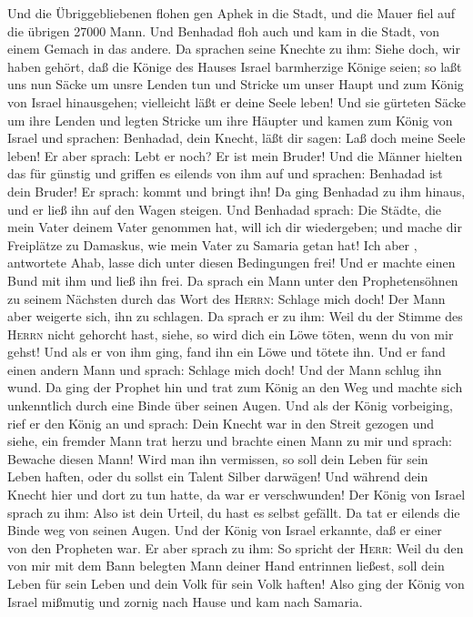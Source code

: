  Und die Übriggebliebenen flohen gen Aphek in die Stadt,
und die Mauer fiel auf die übrigen 27000 Mann. Und Benhadad floh auch
und kam in die Stadt, von einem Gemach in das andere.  Da
sprachen seine Knechte zu ihm: Siehe doch, wir haben gehört, daß die
Könige des Hauses Israel barmherzige Könige seien; so laßt uns nun Säcke
um unsre Lenden tun und Stricke um unser Haupt und zum König von Israel
hinausgehen; vielleicht läßt er deine Seele leben!  Und
sie gürteten Säcke um ihre Lenden und legten Stricke um ihre Häupter und
kamen zum König von Israel und sprachen: Benhadad, dein Knecht, läßt dir
sagen: Laß doch meine Seele leben! Er aber sprach: Lebt er noch? Er ist
mein Bruder!  Und die Männer hielten das für günstig und
griffen es eilends von ihm auf und sprachen: Benhadad ist dein Bruder!
Er sprach: kommt und bringt ihn! Da ging Benhadad zu ihm hinaus, und er
ließ ihn auf den Wagen steigen.  Und Benhadad sprach: Die
Städte, die mein Vater deinem Vater genommen hat, will ich dir
wiedergeben; und mache dir Freiplätze zu Damaskus, wie mein Vater zu
Samaria getan hat! Ich aber , antwortete Ahab, lasse dich unter diesen
Bedingungen frei! Und er machte einen Bund mit ihm und ließ ihn frei.
 Da sprach ein Mann unter den Prophetensöhnen zu seinem
Nächsten durch das Wort des \textsc{Herrn}: Schlage mich doch! Der Mann
aber weigerte sich, ihn zu schlagen.  Da sprach er zu
ihm: Weil du der Stimme des \textsc{Herrn} nicht gehorcht hast, siehe,
so wird dich ein Löwe töten, wenn du von mir gehst! Und als er von ihm
ging, fand ihn ein Löwe und tötete ihn.  Und er fand
einen andern Mann und sprach: Schlage mich doch! Und der Mann schlug ihn
wund.  Da ging der Prophet hin und trat zum König an den
Weg und machte sich unkenntlich durch eine Binde über seinen Augen.
 Und als der König vorbeiging, rief er den König an und
sprach: Dein Knecht war in den Streit gezogen und siehe, ein fremder
Mann trat herzu und brachte einen Mann zu mir und sprach: Bewache diesen
Mann! Wird man ihn vermissen, so soll dein Leben für sein Leben haften,
oder du sollst ein Talent Silber darwägen!  Und während
dein Knecht hier und dort zu tun hatte, da war er verschwunden! Der
König von Israel sprach zu ihm: Also ist dein Urteil, du hast es selbst
gefällt.  Da tat er eilends die Binde weg von seinen
Augen. Und der König von Israel erkannte, daß er einer von den Propheten
war.  Er aber sprach zu ihm: So spricht der
\textsc{Herr}: Weil du den von mir mit dem Bann belegten Mann deiner
Hand entrinnen ließest, soll dein Leben für sein Leben und dein Volk für
sein Volk haften!  Also ging der König von Israel
mißmutig und zornig nach Hause und kam nach Samaria.

